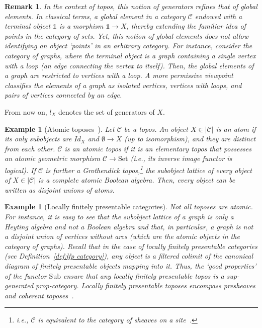 \documentclass[preprint,3p,times]{elsarticle}
\newtheorem{example}[definition]{Example}
\newtheorem{remark}[definition]{Remark}
\newcommand{\Set}{\mathrm{Set}}
\newcommand{\Sub}{\mathrm{Sub}}
\begin{document}
\begin{remark}
In the context of topos, this notion of generators refines that of global elements. In classical terms, a global element in a category $\mathcal{C}$ endowed with a terminal object $\mathbb{1}$ is a morphism $\mathbb{1} \to X$, thereby extending the familiar idea of points in the category of sets. Yet, this notion of global elements does not allow identifying an object `points' in an arbitrary category. For instance, consider the category of graphs, where the terminal object is a graph containing a single vertex with a loop (an edge connecting the vertex to itself). Then, the global elements of a graph are restricted to vertices with a loop. A more permissive viewpoint classifies the elements of a graph as isolated vertices, vertices with loops, and pairs of vertices connected by an edge.
\end{remark}

From now on, $l_X$ denotes the set of generators of $X$. %

\begin{example}[Atomic toposes~\cite{Car12}]
Let $\mathcal{C}$ be a topos. An object $X \in |\mathcal{C}|$ is an \emph{atom} if its only subobjects are $Id_X$ and $\emptyset \to X$ (up to isomorphism), and they are distinct from each other. $\mathcal{C}$ is an \emph{atomic topos} if it is an elementary topos that possesses an atomic geometric morphism $\mathcal{C} \to \Set$ (i.e., its inverse image functor is logical). If $\mathcal{C}$ is further a Grothendick topos,\footnote{i.e., $\mathcal{C}$ is equivalent to the category of sheaves on a site~\cite{Car17}.} the subobject lattice of every object of $X \in |\mathcal{C}|$ is a complete atomic Boolean algebra. Then, every object can be written as disjoint unions of atoms. 
\end{example}

\begin{example}[Locally finitely presentable categories]
\label{ex:supgeneretion:presheaves}
Not all toposes are atomic. For instance, it is easy to see that the subobject lattice of a graph is only a Heyting algebra and not a Boolean algebra and that, in particular, a graph is not a disjoint union of vertices without arcs (which are the atomic objects in the category of graphs).
Recall that in the case of locally finitely presentable categories (see Definition~\ref{def:lfp category}), any object is a filtered colimit of the canonical diagram of finitely presentable objects mapping into it. Thus, the `good properties' of the functor \(\Sub\) ensure that any locally finitely presentable topos is a sup-generated prop-category. Locally finitely presentable toposes encompass presheaves and coherent toposes~\cite[Section D.3.3]{Johnstone02}.

\end{example}
\end{document}
